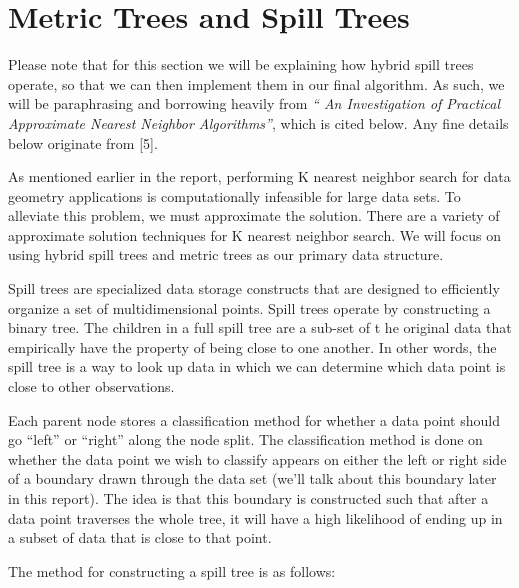 \chapter{Metric Trees and Spill Trees}

\vspace{5 mm}
\noindent
Please note that for this section we will be explaining how hybrid spill 
trees operate, so that we can then implement them in our final algorithm. 
As such, we will be paraphrasing and borrowing heavily from  \textit{``
An Investigation of Practical Approximate Nearest Neighbor Algorithms''},
which is cited below.  Any fine details below originate from [5].

\vspace{5 mm}
\noindent
As mentioned earlier in the report, performing K nearest neighbor search for 
data geometry applications is computationally infeasible for large data sets. 
To alleviate this problem, we must approximate the solution. There are a 
variety of approximate solution techniques for K nearest neighbor search. We 
will focus on using hybrid spill trees and metric trees as our primary data 
structure.

\vspace{5 mm}
\noindent
Spill trees are specialized data storage constructs that are designed to 
efficiently organize a set of multidimensional points.  Spill trees operate by 
constructing a binary tree. The children in a full spill tree are a sub-set of t
he original data that empirically have the property of being close to one 
another. In other words, the spill tree is a way to look up data in which we 
can determine which data point is close to other observations.

\vspace{5 mm}
\noindent
Each parent node stores a classification method for whether a data point should 
go ``left'' or ``right'' along the node split. The classification method is 
done on whether the data point we wish to classify appears on either the left 
or right side of a boundary drawn through the data set (we'll talk about this 
boundary later in this report). The idea is that this boundary is constructed 
such that after a data point traverses the whole tree, it will have a high 
likelihood of ending up in a subset of data that is close to that point.

\vspace{5 mm}
\noindent
The method for constructing a spill tree is as follows:


